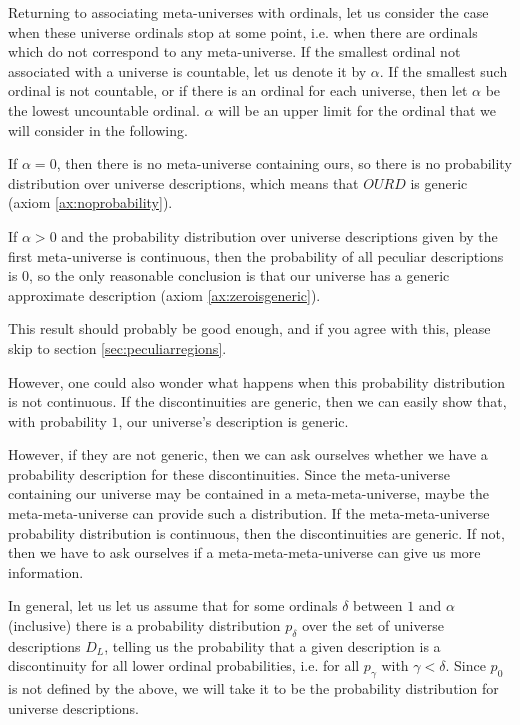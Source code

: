 \documentclass[a4paper
,draft
]{article}
\def\descriptions{D_L}
\def\our_description{OURD}
\begin{document}
Returning to associating meta-universes with ordinals, let us consider the case
when these universe ordinals stop at some point, i.e. when there are ordinals
which do not correspond to any meta-universe.
If the smallest
ordinal not associated with a universe is countable, let us denote it by
$\alpha$.
If the smallest such ordinal is not countable,
or if there is an ordinal for each
universe, then let $\alpha$ be the lowest uncountable ordinal. $\alpha$ will
be an upper limit for the ordinal that we will consider in the following.

If $\alpha = 0$, then there is no meta-universe containing ours, so there
is no probability distribution over universe descriptions,
which means that $\our_description$ is generic (axiom \ref{ax:noprobability}).

If $\alpha > 0$ and the probability distribution over universe descriptions
given by the first meta-universe is continuous,
then the probability of all peculiar descriptions is $0$,
so the only reasonable conclusion is that our universe has a generic
approximate description (axiom \ref{ax:zeroisgeneric}).

This result should probably be good enough, and if you agree with
this, please skip to section \ref{sec:peculiarregions}.

However, one could also wonder what happens when this probability distribution
is not continuous. If the discontinuities are generic, then we can easily
show that, with probability $1$, our universe's description is generic.

However, if they are not generic, then we can ask ourselves
whether we have a probability
description for these discontinuities. Since the meta-universe containing our
universe may be contained in a meta-meta-universe, maybe the meta-meta-universe
can provide such a distribution. If the meta-meta-universe probability
distribution is continuous, then the discontinuities are generic. If not,
then we have to ask ourselves if a meta-meta-meta-universe can give us more
information.

In general, let us let us assume that for some ordinals $\delta$ between
$1$ and $\alpha$ (inclusive) there is a probability distribution
$p_\delta$ over the set of universe descriptions $\descriptions$, telling us
the probability that a given description is a discontinuity
for all lower ordinal probabilities, i.e. for all
$p_\gamma$ with $\gamma < \delta$.
Since $p_0$ is not defined by the above, we will take it to be the
probability distribution for universe descriptions.
\end{document}

